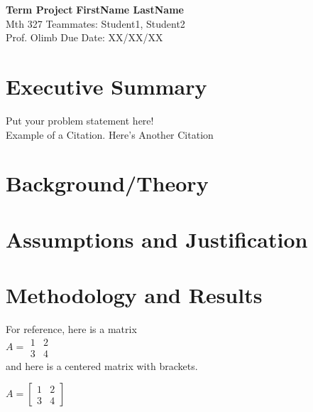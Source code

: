 \documentclass[a4paper, 11pt]{article}
\begin{document}
\noindent
\large\textbf{Term Project} \hfill \textbf{FirstName LastName} \\
\normalsize Mth 327 \hfill Teammates: Student1, Student2 \\
Prof. Olimb \hfill Due  Date: XX/XX/XX \\


\section*{Executive Summary}
Put your problem statement here!\\ 
 Example of a Citation\cite[p.219]{Robotics}. Here's Another Citation\cite{Flueck}

\section*{Background/Theory} %
\lipsum[2]

\section*{Assumptions and Justification} %
\lipsum[2]

\section*{Methodology and Results}
For reference, here is a matrix\\
$A =\begin{matrix}1&2\\3&4\end{matrix}$\\
and here is a centered matrix with brackets.
\begin{center}$A =\begin{bmatrix}1&2\\3&4\end{bmatrix}$\end{center}



\lipsum[3]
\end{document}
